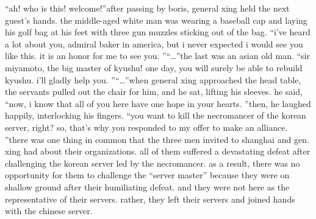 “ah! who is this! welcome!”after passing by boris, general xing held the next guest’s hands.
 the middle-aged white man was wearing a baseball cap and laying his golf bag at his feet with three gun muzzles sticking out of the bag.
“i’ve heard a lot about you, admiral baker in america, but i never expected i would see you like this.
 it is an honor for me to see you.
”“…”the last was an asian old man.
“sir miyamoto, the big master of kyushu! one day, you will surely be able to rebuild kyushu.
 i’ll gladly help you.
”“…”when general xing approached the head table, the servants pulled out the chair for him, and he sat, lifting his sleeves.
he said, “now, i know that all of you here have one hope in your hearts.
”then, he laughed happily, interlocking his fingers.
“you want to kill the necromancer of the korean server, right? so, that’s why you responded to my offer to make an alliance.
”there was one thing in common that the three men invited to shanghai and gen.
 xing had about their organizations.
 all of them suffered a devastating defeat after challenging the korean server led by the necromancer.
as a result, there was no opportunity for them to challenge the “server master” because they were on shallow ground after their humiliating defeat.
and they were not here as the representative of their servers.
 rather, they left their servers and joined hands with the chinese server.

